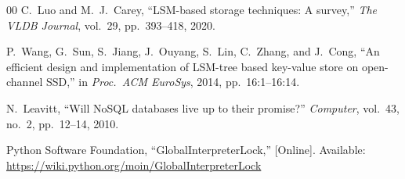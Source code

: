 \documentclass[conference]{IEEEtran}
\begin{document}
\begin{thebibliography}{00}
C.~Luo and M.~J.~Carey, ``LSM-based storage techniques: A survey,'' \textit{The VLDB Journal}, vol.~29, pp.~393--418, 2020.

P.~Wang, G.~Sun, S.~Jiang, J.~Ouyang, S.~Lin, C.~Zhang, and J.~Cong, ``An efficient design and implementation of LSM-tree based key-value store on open-channel SSD,'' in \textit{Proc.\ ACM EuroSys}, 2014, pp.~16:1--16:14.

N.~Leavitt, ``Will NoSQL databases live up to their promise?'' \textit{Computer}, vol.~43, no.~2, pp.~12--14, 2010.

Python Software Foundation, ``GlobalInterpreterLock,'' [Online]. Available: \url{https://wiki.python.org/moin/GlobalInterpreterLock}

\end{thebibliography}
\end{document}
